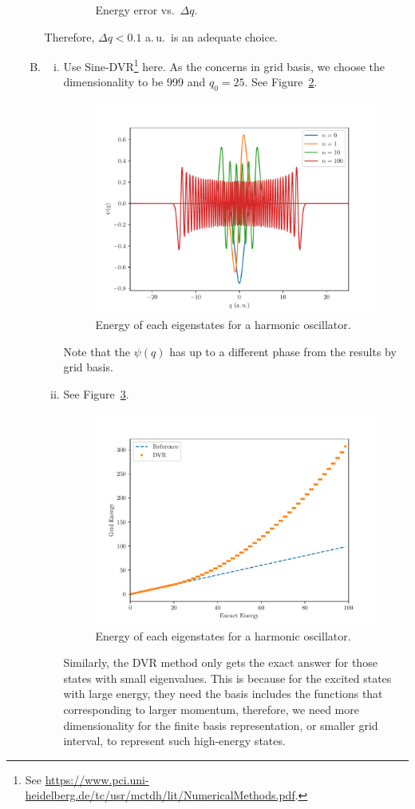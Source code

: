 \documentclass{article}
\begin{document}
\begin{enumerate}[1.]
\begin{enumerate}[(A)]
\begin{enumerate}[(i)]
\begin{figure}[H]
\begin{minipage}{0.45\linewidth}
        \end{minipage}
        \caption{Energy error vs.\ $\Delta q$.}
        \label{fig:q6a-3}
      \end{figure}
    \end{enumerate}
    Therefore, $\Delta q < 0.1$ a.\,u.\ is an adequate choice.
    \item
    \begin{enumerate}[(i)]
      \item Use Sine-DVR\footnote{See \url{https://www.pci.uni-heidelberg.de/tc/usr/mctdh/lit/NumericalMethods.pdf}.} here.  
      As the concerns in grid basis, we choose the dimensionality to be 999 and $q_0 = 25$.
      See Figure~\ref{fig:q6b-1}.
      \begin{figure}[H]
        \centering
        \includegraphics[width=0.6\linewidth]{q6b-1.pdf}
        \caption{Energy of each eigenstates for a harmonic oscillator.}
        \label{fig:q6b-1}
      \end{figure}
      Note that the $\psi(q)$ has up to a different phase from the results by grid basis.
      \item See Figure~\ref{fig:q6b-2}.
      \begin{figure}[H]
        \centering
        \includegraphics[width=0.6\linewidth]{q6b-2.pdf}
        \caption{Energy of each eigenstates for a harmonic oscillator.}
        \label{fig:q6b-2}
      \end{figure}
      Similarly, the DVR method only gets the exact answer for those states with small eigenvalues. This is because for the excited states with large energy, they need the basis includes the functions that corresponding to larger momentum, therefore, we need more dimensionality for the finite basis representation, or smaller grid interval, to represent such high-energy states.  


\end{enumerate}
\end{enumerate}
\end{enumerate}
\end{document}
